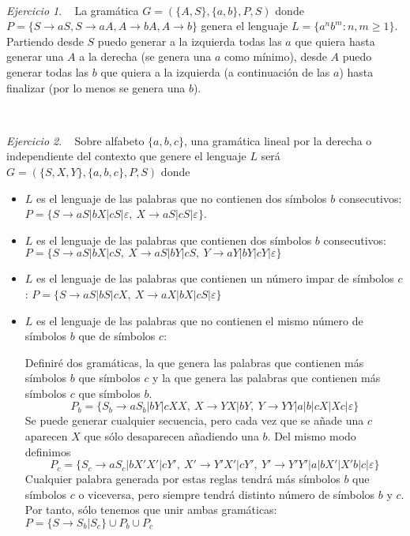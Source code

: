 \documentclass[12pt,spanish]{article}
\theoremstyle{definition}
\theoremstyle{remark}
\newtheorem{exercise}{Ejercicio}%
\begin{document}
~
\begin{exercise}~ La gramática $G=(\{A,S\},\{a,b\},P,S)$ donde \\
  $P=\{S\rightarrow aS, S \rightarrow aA, A \rightarrow bA, A
  \rightarrow b\}$ genera el lenguaje $L=\{a^nb^m: n,m \geq 1\}$.
  Partiendo desde $S$ puedo generar a la izquierda todas las $a$ que
  quiera hasta generar una $A$ a la derecha (se genera una $a$ como
  mínimo), desde $A$ puedo generar todas las $b$ que quiera a la
  izquierda (a continuación de las $a$) hasta finalizar (por lo menos
  se genera una $b$).
\end{exercise}
~
\begin{exercise}~ Sobre alfabeto $\{a,b,c\}$, una gramática lineal por
  la derecha o independiente del contexto que genere el lenguaje $L$
  será $G=(\{S,X,Y\},\{a,b,c\},P,S)$ donde
  \begin{itemize}
  \item $L$ es el lenguaje de las palabras que no contienen dos
    símbolos $b$ consecutivos:
    $P=\{S\rightarrow aS|bX|cS|\varepsilon, \ X\rightarrow
    aS|cS|\varepsilon\}$.
  \item $L$ es el lenguaje de las palabras que contienen dos símbolos
    $b$ consecutivos: \\
    $P=\{S\rightarrow aS|bX|cS, \ X\rightarrow aS|bY|cS, \ Y
    \rightarrow aY|bY|cY|\varepsilon\}$
  \item $L$ es el lenguaje de las palabras que contienen un número
    impar de símbolos $c$:
    $P=\{S\rightarrow aS|bS|cX, \ X\rightarrow aX|bX|cS|\varepsilon\}$
  \item $L$ es el lenguaje de las palabras que no contienen el mismo
    número de símbolos $b$ que de símbolos $c$:

    Definiré dos gramáticas, la que genera las palabras que contienen
    más símbolos $b$ que símbolos $c$ y la que genera las palabras que
    contienen más símbolos $c$ que símbolos $b$.
    \[P_b=\{S_b\rightarrow aS_b|bY|cXX, \ X \rightarrow YX|bY, \ Y
      \rightarrow YY|a|b|cX|Xc|\varepsilon\}\] Se puede generar
    cualquier secuencia, pero cada vez que se
    añade una $c$ aparecen $X$ que sólo desaparecen añadiendo una
    $b$. Del mismo modo definimos
    \[P_c=\{S_c\rightarrow aS_c|bX'X'|cY', \ X' \rightarrow Y'X'|cY',
      \ Y' \rightarrow Y'Y'|a|bX'|X'b|c|\varepsilon\}\] Cualquier
    palabra generada por estas reglas tendrá más símbolos $b$ que
    símbolos $c$ o viceversa, pero siempre tendrá distinto número de
    símbolos $b$ y $c$. Por tanto, sólo tenemos que unir ambas
    gramáticas: $P=\{S\rightarrow S_b|S_c\} \cup P_b \cup P_c$
  \end{itemize}
\end{exercise}
\end{document}
